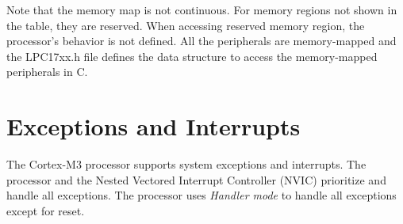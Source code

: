 
Note that the memory map is not continuous. For memory regions not shown in the table, they are reserved. When accessing reserved memory region, the processor's behavior is not defined. All the peripherals are memory-mapped and the LPC17xx.h file defines the data structure to access the memory-mapped peripherals in C. 

\section{Exceptions and Interrupts}
The Cortex-M3 processor supports system exceptions and interrupts. 
The processor and the Nested Vectored Interrupt Controller (NVIC) 
prioritize and handle all exceptions. The processor uses {\em Handler mode}
to handle all exceptions except for reset.

